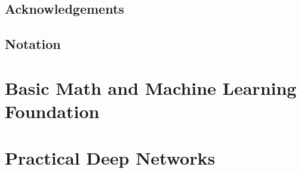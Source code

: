 \documentclass[10pt,\papersize,twoside,openright]{book}
\begin{document}
\setcounter{page}{1}
\frontmatter

\tableofcontents

\chapter*{Acknowledgements}


\chapter*{Notation}


\mainmatter



\part{Basic Math and Machine Learning Foundation}









\part{Practical Deep Networks}




\end{document}
